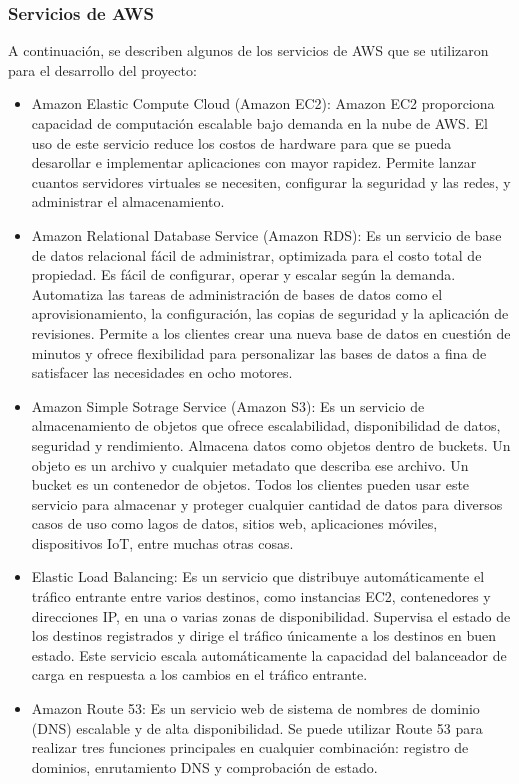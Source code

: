 \subsubsection{Servicios de AWS}
A continuación, se describen algunos de los servicios de AWS que se utilizaron para el desarrollo del proyecto:
    \begin{itemize}
        \item Amazon Elastic Compute Cloud (Amazon EC2): Amazon EC2 proporciona capacidad de computación escalable bajo demanda en la nube de AWS. El uso de este servicio reduce los costos de hardware para que se pueda desarollar e implementar aplicaciones con mayor rapidez. Permite lanzar cuantos servidores virtuales se necesiten, configurar la seguridad y las redes, y administrar el almacenamiento.
        \item Amazon Relational Database Service (Amazon RDS): Es un servicio de base de datos relacional fácil de administrar, optimizada para el costo total de propiedad. Es fácil de configurar, operar y escalar según la demanda. Automatiza las tareas de administración de bases de datos como el aprovisionamiento, la configuración, las copias de seguridad y la aplicación de revisiones. Permite a los clientes crear una nueva base de datos en cuestión de minutos y ofrece flexibilidad para personalizar las bases de datos a fina de satisfacer las necesidades en ocho motores.
        \item Amazon Simple Sotrage Service (Amazon S3): Es un servicio de almacenamiento de objetos que ofrece escalabilidad, disponibilidad de datos, seguridad y rendimiento. Almacena datos como objetos dentro de buckets. Un objeto es un archivo y cualquier metadato que describa ese archivo. Un bucket es un contenedor de objetos. Todos los clientes pueden usar este servicio para almacenar y proteger cualquier cantidad de datos para diversos casos de uso como lagos de datos, sitios web, aplicaciones móviles, dispositivos IoT, entre muchas otras cosas. 
        \item Elastic Load Balancing: Es un servicio que distribuye automáticamente el tráfico entrante entre varios destinos, como instancias EC2, contenedores y direcciones IP, en una o varias zonas de disponibilidad. Supervisa el estado de los destinos registrados y dirige el tráfico únicamente a los destinos en buen estado. Este servicio escala automáticamente la capacidad del balanceador de carga en respuesta a los cambios en el tráfico entrante.
        \item Amazon Route 53: Es un servicio web de sistema de nombres de dominio (DNS) escalable y de alta disponibilidad. Se puede utilizar Route 53 para realizar tres funciones principales en cualquier combinación: registro de dominios, enrutamiento DNS y comprobación de estado.
    \end{itemize}